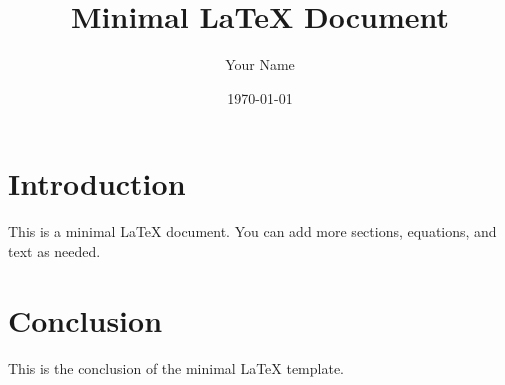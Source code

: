 \documentclass{article}
\title{Minimal LaTeX Document}
\author{Your Name}
\date{\today}
\begin{document}
\maketitle

\section{Introduction}

This is a minimal LaTeX document. You can add more sections, equations, and text as needed.

\section{Conclusion}

This is the conclusion of the minimal LaTeX template.
\end{document}
